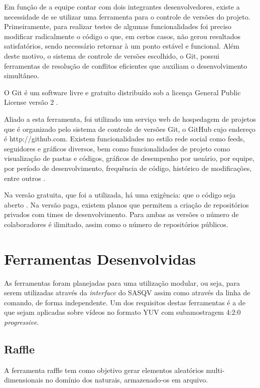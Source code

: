 Em função de a equipe contar com dois integrantes desenvolvedores, existe a necessidade de se utilizar uma ferramenta para o controle de versões do projeto. Primeiramente, para realizar testes de algumas funcionalidades foi preciso modificar radicalmente o código o que, em certos casos, não gerou resultados satisfatórios, sendo necessário retornar à um ponto estável e funcional. Além deste motivo, o sistema de controle de versões escolhido, o Git, possui ferramentas de resolução de conflitos eficientes que auxiliam o desenvolvimento simultâneo.

O Git é um software livre e gratuito distribuído sob a licença  General Public License versão 2 \cite{git}.

Aliado a esta ferramenta, foi utilizado um serviço web de hospedagem de projetos que é organizado pelo sistema de controle de versões Git, o GitHub cujo endereço é http://github.com. Existem funcionalidades no estilo rede social como feeds, seguidores e gráficos diversos, bem como funcionalidades de projeto como visualização de pastas e códigos, gráficos de desempenho por usuário, por equipe, por período de desenvolvimento, frequência de código, histórico de modificações, entre outros \cite{githubabout}.

Na versão gratuita, que foi a utilizada, há uma exigência: que o código seja aberto \cite{githubabout}. Na versão paga, existem planos que permitem a criação de repositórios privados com times de desenvolvimento. Para ambas as versões o número de colaboradores é ilimitado, assim como o número de repositórios públicos.

\section{Ferramentas Desenvolvidas}

As ferramentas foram planejadas para uma utilização modular, ou seja, para serem utilizadas através da \emph{interface} do SASQV assim como através da linha de comando, de forma independente. Um dos requisitos destas ferramentas é a de que sejam aplicadas sobre vídeos no formato YUV com subamostragem 4:2:0 \emph{progressive}.

\subsection{Raffle}

A ferramenta raffle tem como objetivo gerar elementos aleatórios multi-dimensionais no domínio dos naturais, armazenado-os em arquivo.

